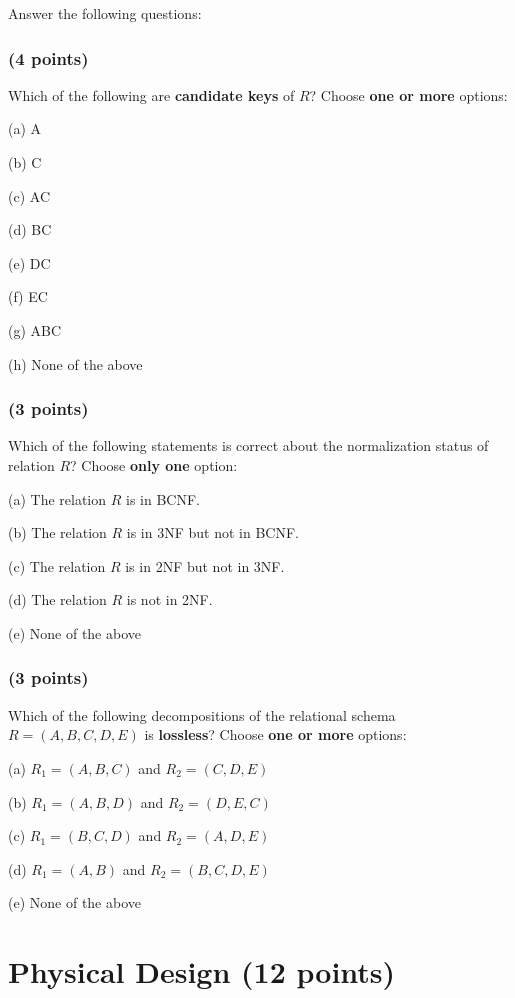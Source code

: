 \documentclass[11pt,a4paper]{article}
\begin{document}
Answer the following questions:

\subsubsection{(4 points)}
Which of the following are \textbf{candidate keys} of $R$? Choose \textbf{one or more} options:

(a) A

(b) C

(c) AC

(d) BC

(e) DC

(f) EC

(g) ABC

(h) None of the above

\subsubsection{(3 points)}
Which of the following statements is correct about the normalization status of relation $R$? Choose \textbf{only one} option:

(a) The relation $R$ is in BCNF.

(b) The relation $R$ is in 3NF but not in BCNF.

(c) The relation $R$ is in 2NF but not in 3NF.

(d) The relation $R$ is not in 2NF.

(e) None of the above

\subsubsection{(3 points)}
Which of the following decompositions of the relational schema $R = (A, B, C, D, E)$ is \textbf{lossless}? Choose \textbf{one or more} options:

(a) $R_1 = (A, B, C)$ and $R_2 = (C, D, E)$

(b) $R_1 = (A, B, D)$ and $R_2 = (D, E, C)$

(c) $R_1 = (B, C, D)$ and $R_2 = (A, D, E)$

(d) $R_1 = (A, B)$ and $R_2 = (B, C, D, E)$

(e) None of the above

\newpage

\section{Physical Design (12 points)}
\end{document}
